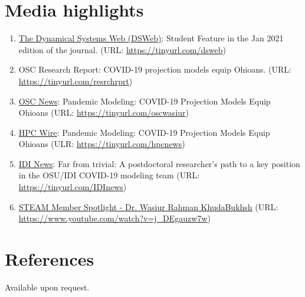 \documentclass[11pt,a4paper,sans]{moderncv}        %
\begin{document}
\section{Media highlights}
\begin{enumerate}
\item \href{https://dsweb.siam.org/The-Magazine/Article/student-feature-wasiur-rahman-khuda-bukhsh}{The Dynamical Systems Web (DSWeb)}: Student Feature in the Jan 2021 edition of the journal. (URL: \url{https://tinyurl.com/dsweb})
\item {OSC Research Report}: COVID-19 projection models equip Ohioans. (URL: \url{https://tinyurl.com/resrchrprt})
\item \href{https://www.osc.edu/press/pandemic_modeling_covid_19_projection_models_equip_ohioans}{OSC News}: Pandemic Modeling: COVID-19 Projection Models Equip Ohioans (URL: \url{https://tinyurl.com/oscwasiur})
\item \href{https://www.hpcwire.com/off-the-wire/pandemic-modeling-covid-19-projection-models-equip-ohioans/}{HPC Wire}: Pandemic Modeling: COVID-19 Projection Models Equip Ohioans (ULR: \url{https://tinyurl.com/hpcnews})
\item \href{https://idi.osu.edu/news-articles/far-from-trivial}{IDI News}: Far from trivial: A postdoctoral researcher's path to a key position in the OSU/IDI COVID-19 modeling team (URL: \url{https://tinyurl.com/IDInews})
\item \href{https://www.youtube.com/watch?v=j_DEgauzw7w}{STEAM Member Spotlight - Dr. Wasiur Rahman KhudaBukhsh} (URL: \url{https://www.youtube.com/watch?v=j_DEgauzw7w})
\end{enumerate}

\section{References}
Available upon request. 

\end{document}
